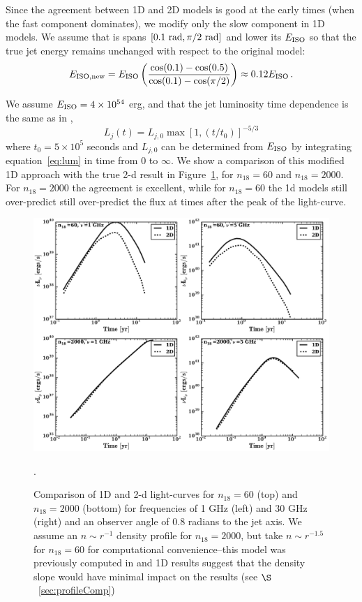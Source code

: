 \documentclass[usenatbib,fleqn]{mnras}
\begin{document}
Since the agreement between 1D and 2D models is good at the early
times (when the fast component dominates), we modify only the slow
component in 1D models. We assume that is spans $[0.1\ {\rm rad},
\pi/2\ {\rm rad}]$ and lower its $E_{\rm ISO}$ so that the true jet
energy remains unchanged with respect to the original model:
\begin{equation}\label{eq:Eiso}
 E_{\rm ISO, new} = E_{\rm ISO} \left(\frac{\cos(0.1) - \cos(0.5)}{\cos(0.1) - \cos(\pi/2)}\right)\approx 0.12 E_{\rm ISO}\, .
\end{equation}

We assume $E_{\rm ISO} = 4\times 10^{54}$ erg, and that the jet
luminosity time dependence is the same as in \citet{Mimica+2015},
\begin{equation}\label{eq:lum}
L_j(t) = L_{j,0}\max\left[1, (t/t_0)\right]^{-5/3}
\end{equation}
where $t_0 = 5\times 10^5$ seconds and $L_{j, 0}$ can be determined
from $E_{\rm ISO}$ by integrating equation~\ref{eq:lum} in time from
$0$ to $\infty$. We show a comparison of this modified 1D approach
with the true 2-d result in Figure~\ref{fig:1d2dB}, for $n_{18}=60$
and $n_{18}=2000$. For $n_{18}=2000$ the agreement is excellent, while
for $n_{18}=60$ the 1d models still over-predict still over-predict
the flux at times after the peak of the light-curve.


\begin{figure}
\includegraphics[width=16cm]{1d_2d.pdf}
\caption{\label{fig:1d2dB} Comparison of 1D and 2-d light-curves for
  $n_{18}=60$ (top) and $n_{18}=2000$ (bottom) for frequencies of 1
  GHz (left) and 30 GHz (right) and an observer angle of 0.8 radians
  to the jet axis. We assume an $n\sim r^{-1}$ density profile for
  $n_{18}=2000$, but take $n\sim r^{-1.5}$ for $n_{18}=60$ for
  computational convenience--this model was previously computed in
  \citet{Mimica+2015} and 1D results suggest that the density slope would
  have minimal impact on the results (see $\S$~\ref{sec:profileComp})}.
\end{figure}
\end{document}
